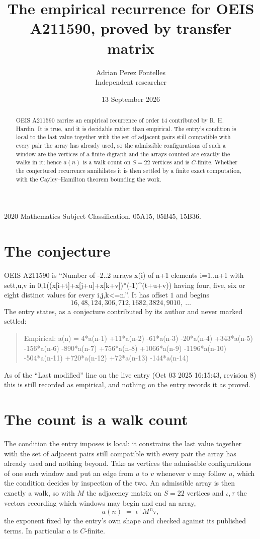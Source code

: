 \documentclass[11pt,a4paper]{article}
\title{The empirical recurrence for OEIS A211590, proved by transfer matrix}
\author{Adrian Perez Fontelles\\ \small Independent researcher}
\date{13 September 2026}
\theoremstyle{plain}
\theoremstyle{definition}
\begin{document}
\maketitle

\begin{abstract}
OEIS A211590 carries an empirical recurrence of order $14$ contributed by R. H. Hardin. It is
true, and it is decidable rather than empirical. The entry's condition is local to the last value together with the set of adjacent pairs still compatible with every pair the array has already used, so
the admissible configurations of such a window are the vertices of a finite digraph and the
arrays counted are exactly the walks in it; hence $a(n)$ is a walk count on $S=22$ vertices
and is $C$-finite. Whether the conjectured recurrence annihilates it is then settled by a
finite exact computation, with the Cayley--Hamilton theorem bounding the work.
\end{abstract}

\noindent\small 2020 Mathematics Subject Classification. 05A15, 05B45, 15B36.\normalsize

\section{The conjecture}

OEIS A211590 is ``Number of -2..2 arrays x(i) of n+1 elements i=1..n+1 with set{t,u,v in 0,1}((x[i+t]+x[j+u]+x[k+v])*(-1)\^{}(t+u+v)) having four, five, six or eight distinct values for every i,j,k<=n.''. It has offset $1$ and begins
\[
16, 48, 124, 306, 712, 1682, 3824, 9010,\ \dots
\]
The entry states, as a conjecture contributed by its author and never marked settled:
\begin{quote}
Empirical: a(n) = 4*a(n-1) +11*a(n-2) -61*a(n-3) -20*a(n-4) +343*a(n-5) -156*a(n-6) -890*a(n-7) +756*a(n-8) +1066*a(n-9) -1196*a(n-10) -504*a(n-11) +720*a(n-12) +72*a(n-13) -144*a(n-14)
\end{quote}
As of the ``Last modified'' line on the live entry (Oct 03 2025 16:15:43, revision 8) this is still
recorded as empirical, and nothing on the entry records it as proved.

\section{The count is a walk count}

The condition the entry imposes is local: it constrains the last value together with the set of adjacent pairs still compatible with every pair the array has already used and nothing beyond. Take as
vertices the admissible configurations of one such window and put an edge from $u$ to $v$
whenever $v$ may follow $u$, which the condition decides by inspection of the two. An
admissible array is then exactly a walk, so with $M$ the adjacency matrix on $S=22$ vertices
and $\iota,\tau$ the vectors recording which windows may begin and end an array,
\[
a(n)\;=\;\iota^{\!\top}M^{\,n}\tau ,
\]
the exponent fixed by the entry's own shape and checked against its published terms. In
particular $a$ is $C$-finite.
\end{document}
